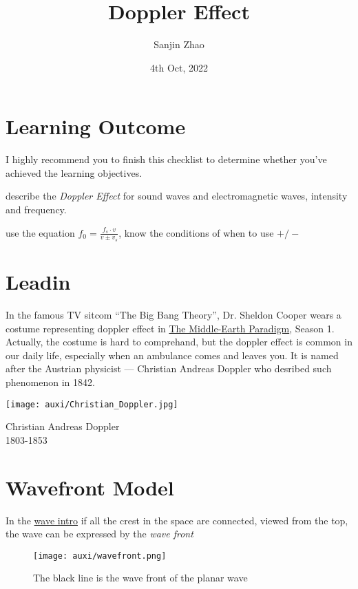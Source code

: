 \documentclass[a4paper]{tufte-handout}
\title{Doppler Effect}
\author{Sanjin Zhao}
\date{4th Oct, 2022}  %
\begin{document}
\maketitle%
\section*{Learning Outcome}
I highly recommend you to finish this checklist to determine whether you've achieved the learning objectives.
\begin{todolist}
  \item describe the \emph{Doppler Effect} for sound waves and electromagnetic waves, intensity and frequency.
  \item use the equation $f_0=\frac{f_s \cdot v}{v\pm v_s}$, know the conditions of when to use $+/-$
\end{todolist}
\clearpage

\section{Leadin}
In the famous TV sitcom ``The Big Bang Theory'', Dr. Sheldon Cooper wears a costume representing doppler effect in \href{https://www.vulture.com/article/smartest-big-bang-theory-episodes-science.html}{The Middle-Earth Paradigm}, Season 1. Actually, the costume is hard to comprehand, but the doppler effect is common in our daily life, especially when an ambulance comes and leaves you. It is named after the Austrian physicist --- Christian Andreas Doppler who desribed such phenomenon in 1842. 
\begin{marginfigure}[-3cm]
\texttt{[image: auxi/Christian\_Doppler.jpg]}
\caption{Christian Andreas Doppler\\1803-1853}
\end{marginfigure}

\section{Wavefront Model}
In the \href{https://phet.colorado.edu/sims/html/waves-intro/latest/waves-intro_en.html}{wave intro} if all the crest in the space are connected, viewed from the top, the wave can be expressed by the \emph{wave front}
\begin{figure}[h]
\centering
\texttt{[image: auxi/wavefront.png]}
\caption{The black line is the wave front of the planar wave}
\end{figure}
\end{document}

